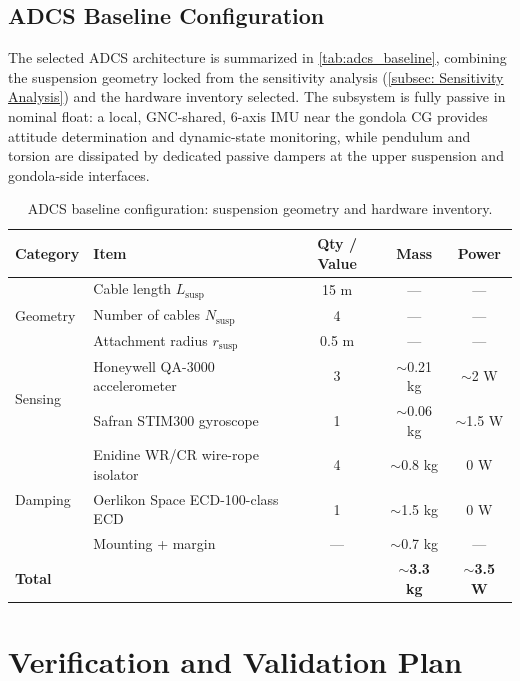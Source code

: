 \subsection{ADCS Baseline Configuration}
\label{sec:adcs_baseline}

The selected ADCS architecture is summarized in \autoref{tab:adcs_baseline}, combining the suspension geometry locked from the sensitivity analysis (\autoref{subsec: Sensitivity Analysis}) and the hardware inventory selected. The subsystem is fully passive in nominal float: a local, GNC-shared, 6-axis IMU near the gondola CG provides attitude determination and dynamic-state monitoring, while pendulum and torsion are dissipated by dedicated passive dampers at the upper suspension and gondola-side interfaces.

\begin{table}[h]
\centering
\caption{ADCS baseline configuration: suspension geometry and hardware inventory.}
\label{tab:adcs_baseline}
\begin{tabular}{llccc}
\toprule
Category & Item & Qty / Value & Mass & Power \\
\midrule
\multirow{3}{*}{Geometry}
  & Cable length $L_\mathrm{susp}$       & 15 m  & --- & --- \\
  & Number of cables $N_\mathrm{susp}$   & 4     & --- & --- \\
  & Attachment radius $r_\mathrm{susp}$  & 0.5 m & --- & --- \\
\midrule
\multirow{2}{*}{Sensing}
  & Honeywell QA-3000 accelerometer          & 3 & $\sim$0.21 kg & $\sim$2 W   \\
  & Safran STIM300 gyroscope                 & 1 & $\sim$0.06 kg & $\sim$1.5 W \\
\midrule
\multirow{3}{*}{Damping}
  & Enidine WR/CR wire-rope isolator         & 4 & $\sim$0.8 kg  & 0 W \\
  & Oerlikon Space ECD-100-class ECD         & 1 & $\sim$1.5 kg  & 0 W \\
  & Mounting + margin                        & ---& $\sim$0.7 kg & --- \\
\midrule
\textbf{Total} & & & \textbf{$\sim$3.3 kg} & \textbf{$\sim$3.5 W} \\
\bottomrule
\end{tabular}
\end{table}

\section{Verification and Validation Plan}
 
  